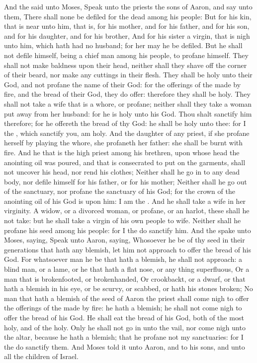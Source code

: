 \begin{biblechapter} %
 And the \LORD said unto Moses, Speak unto the priests the sons of Aaron, and say unto them, There shall none be defiled for the dead among his people:
\verse But for his kin, that is near unto him, that is, for his mother, and for his father, and for his son, and for his daughter, and for his brother,
\verse And for his sister a virgin, that is nigh unto him, which hath had no husband; for her may he be defiled.
\verse But he shall not defile himself, being a chief man among his people, to profane himself.
\verse They shall not make baldness upon their head, neither shall they shave off the corner of their beard, nor make any cuttings in their flesh.
\verse They shall be holy unto their God, and not profane the name of their God: for the offerings of the \LORD made by fire, and the bread of their God, they do offer: therefore they shall be holy.
\verse They shall not take a wife that is a whore, or profane; neither shall they take a woman put away from her husband: for he is holy unto his God.
\verse Thou shalt sanctify him therefore; for he offereth the bread of thy God: he shall be holy unto thee: for I the \LORD, which sanctify you, am holy.
\verse And the daughter of any priest, if she profane herself by playing the whore, she profaneth her father: she shall be burnt with fire.
\verse And he that is the high priest among his brethren, upon whose head the anointing oil was poured, and that is consecrated to put on the garments, shall not uncover his head, nor rend his clothes;
\verse Neither shall he go in to any dead body, nor defile himself for his father, or for his mother;
\verse Neither shall he go out of the sanctuary, nor profane the sanctuary of his God; for the crown of the anointing oil of his God is upon him: I am the \LORD.
\verse And he shall take a wife in her virginity.
\verse A widow, or a divorced woman, or profane, or an harlot, these shall he not take: but he shall take a virgin of his own people to wife.
\verse Neither shall he profane his seed among his people: for I the \LORD do sanctify him.
\verse And the \LORD spake unto Moses, saying,
\verse Speak unto Aaron, saying, Whosoever he be of thy seed in their generations that hath any blemish, let him not approach to offer the bread of his God.
\verse For whatsoever man he be that hath a blemish, he shall not approach: a blind man, or a lame, or he that hath a flat nose, or any thing superfluous,
\verse Or a man that is brokenfooted, or brokenhanded,
\verse Or crookbackt, or a dwarf, or that hath a blemish in his eye, or be scurvy, or scabbed, or hath his stones broken;
\verse No man that hath a blemish of the seed of Aaron the priest shall come nigh to offer the offerings of the \LORD made by fire: he hath a blemish; he shall not come nigh to offer the bread of his God.
\verse He shall eat the bread of his God, both of the most holy, and of the holy.
\verse Only he shall not go in unto the vail, nor come nigh unto the altar, because he hath a blemish; that he profane not my sanctuaries: for I the \LORD do sanctify them.
\verse And Moses told it unto Aaron, and to his sons, and unto all the children of Israel.
\end{biblechapter}

